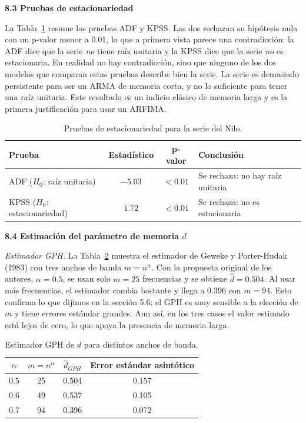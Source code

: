 \documentclass[legalpaper,11pt]{article}
\begin{document}
\begin{enumerate}
\medskip
\noindent\textbf{8.3 Pruebas de estacionariedad}

La Tabla~\ref{tab:pruebas} resume las pruebas ADF y KPSS. Las dos rechazan su hip\'otesis nula con un p-valor menor a 0.01, lo que a primera vista parece una contradicci\'on: la ADF dice que la serie \emph{no} tiene ra\'iz unitaria y la KPSS dice que la serie \emph{no} es estacionaria. En realidad no hay contradicci\'on, sino que ninguno de los dos modelos que comparan estas pruebas describe bien la serie. La serie es demasiado persistente para ser un ARMA de memoria corta, y no lo suficiente para tener una ra\'iz unitaria. Este resultado es un indicio cl\'asico de memoria larga y es la primera justificaci\'on para usar un ARFIMA.

\begin{table}[H]
\centering
\begin{tabular}{lccl}
\hline
\textbf{Prueba} & \textbf{Estad\'istico} & \textbf{p-valor} & \textbf{Conclusi\'on} \\
\hline
ADF ($H_0$: ra\'iz unitaria) & $-5.03$ & $< 0.01$ & Se rechaza: no hay ra\'iz unitaria \\
KPSS ($H_0$: estacionariedad) & $1.72$ & $< 0.01$ & Se rechaza: no es estacionaria \\
\hline
\end{tabular}
\caption{Pruebas de estacionariedad para la serie del Nilo.}
\label{tab:pruebas}
\end{table}

\medskip
\noindent\textbf{8.4 Estimaci\'on del par\'ametro de memoria $d$}

\emph{Estimador GPH.} La Tabla~\ref{tab:gph} muestra el estimador de Geweke y Porter-Hudak (1983) con tres anchos de banda $m = n^{\alpha}$. Con la propuesta original de los autores, $\alpha = 0.5$, se usan solo $m = 25$ frecuencias y se obtiene $\hat d = 0.504$. Al usar m\'as frecuencias, el estimador cambia bastante y llega a 0.396 con $m = 94$. Esto confirma lo que dijimos en la secci\'on 5.6: el GPH es muy sensible a la elecci\'on de $m$ y tiene errores est\'andar grandes. Aun as\'i, en los tres casos el valor estimado est\'a lejos de cero, lo que apoya la presencia de memoria larga.

\begin{table}[H]
\centering
\begin{tabular}{cccc}
\hline
$\alpha$ & $m = n^{\alpha}$ & $\hat d_{GPH}$ & Error est\'andar asint\'otico \\
\hline
0.5 & 25 & 0.504 & 0.157 \\
0.6 & 49 & 0.537 & 0.105 \\
0.7 & 94 & 0.396 & 0.072 \\
\hline
\end{tabular}
\caption{Estimador GPH de $d$ para distintos anchos de banda.}
\label{tab:gph}
\end{table}


\end{enumerate}
\end{document}
